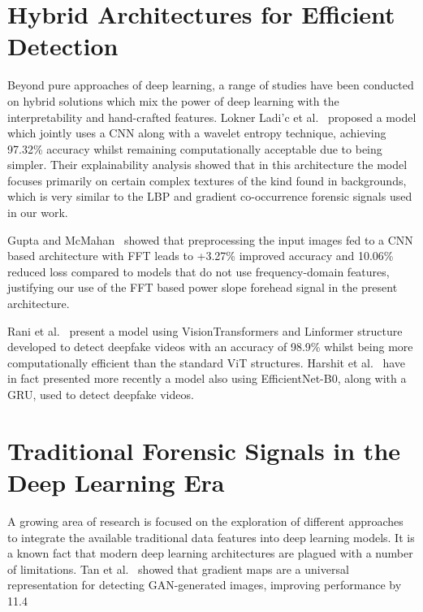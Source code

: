 \section{Hybrid Architectures for Efficient Detection}

Beyond pure approaches of deep learning, a range of studies have been conducted on hybrid solutions which mix the power of deep learning with the interpretability and hand-crafted features. Lokner Ladi’c et al.~\cite{loknerladic2023cnn} proposed a model which jointly uses a CNN along with a wavelet entropy technique, achieving 97.32\% accuracy whilst remaining computationally acceptable due to being simpler. Their explainability analysis showed that in this architecture the model focuses primarily on certain complex textures of the kind found in backgrounds, which is very similar to the LBP and gradient co-occurrence forensic signals used in our work.

Gupta and McMahan~\cite{gupta2025fft} showed that preprocessing the input images fed to a CNN based architecture with FFT leads to +3.27\% improved accuracy and 10.06\% reduced loss compared to models that do not use frequency-domain features, justifying our use of the FFT based power slope forehead signal in the present architecture.

Rani et al.~\cite{rani2025lightweight} present a model using VisionTransformers and Linformer structure developed to detect deepfake videos with an accuracy of 98.9\% whilst being more computationally efficient than the standard ViT structures. Harshit et al.~\cite{harshit2025deepfake} have in fact presented more recently a model also using EfficientNet-B0, along with a GRU, used to detect deepfake videos.

\section{Traditional Forensic Signals in the Deep Learning Era}

A growing area of research is focused on the exploration of different approaches to integrate the available traditional data features into deep learning models. It is a known fact that modern deep learning architectures are plagued with a number of limitations. Tan et al.~\cite{tan2023gradients} showed that gradient maps are a universal representation for detecting GAN-generated images, improving performance by 11.4%

